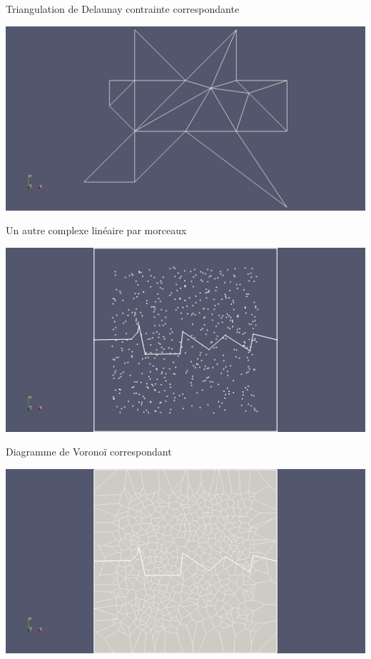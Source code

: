 \documentclass[aspectratio=169, 12pt, a4paper, hyperref={pdfauthor={Alexandre MARIN}, pdfkeywords={IFPEN, Delaunay, Voronoi, mesh generation}, colorlinks=true, linkcolor=purple, urlcolor=blue, citecolor=magenta}]{beamer}
\begin{document}
\begin{Energie}{\normalsize Triangulation de Delaunay contrainte correspondante}
\begin{center}
\includegraphics[scale=0.2, viewport=600 250 1750 1129, clip]{odd_cdt.jpg}
\end{center}
\end{Energie}

\begin{Energie}{\normalsize Un autre complexe linéaire par morceaux}
\begin{center}\vspace{-1cm}
\includegraphics[scale=0.18, viewport=500 0 1700 1300, clip]{plc.jpg}
\end{center}
\end{Energie}

\begin{Energie}{\normalsize Diagramme de Voronoï correspondant}
\begin{center}\vspace{-1cm}
\includegraphics[scale=0.18, viewport=500 0 1700 1300, clip]{extended_vor.jpg}
\end{center}
\end{Energie}
\end{document}
